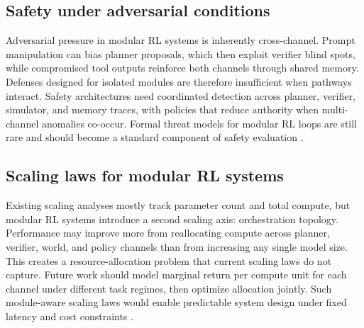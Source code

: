 ﻿\documentclass[conference]{IEEEtran}
\begin{document}
\subsection{Safety under adversarial conditions}
Adversarial pressure in modular RL systems is inherently cross-channel. Prompt manipulation can bias planner proposals, which then exploit verifier blind spots, while compromised tool outputs reinforce both channels through shared memory. Defenses designed for isolated modules are therefore insufficient when pathways interact. Safety architectures need coordinated detection across planner, verifier, simulator, and memory traces, with policies that reduce authority when multi-channel anomalies co-occur. Formal threat models for modular RL loops are still rare and should become a standard component of safety evaluation \cite{arxiv_p_2512_05686,arxiv_p_2602_09367,arxiv_p_2602_13156,arxiv_p_2602_11583}.

\subsection{Scaling laws for modular RL systems}
Existing scaling analyses mostly track parameter count and total compute, but modular RL systems introduce a second scaling axis: orchestration topology. Performance may improve more from reallocating compute across planner, verifier, world, and policy channels than from increasing any single model size. This creates a resource-allocation problem that current scaling laws do not capture. Future work should model marginal return per compute unit for each channel under different task regimes, then optimize allocation jointly. Such module-aware scaling laws would enable predictable system design under fixed latency and cost constraints \cite{arxiv_p_2510_06727,arxiv_p_2601_11658,arxiv_p_2509_02547,arxiv_p_2602_10576}.
\end{document}

